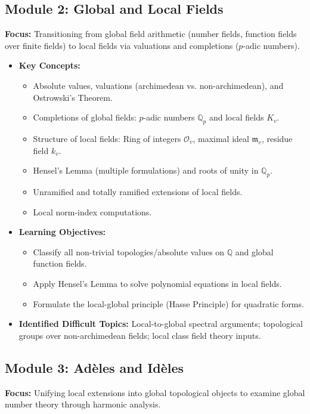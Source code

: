 \documentclass[11pt]{article}
\begin{document}
\subsection*{Module 2: Global and Local Fields}
\textbf{Focus:} Transitioning from global field arithmetic (number fields, function fields over finite fields) to local fields via valuations and completions ($p$-adic numbers).

\begin{itemize}[leftmargin=*]
    \item \textbf{Key Concepts:}
        \begin{itemize}
            \item Absolute values, valuations (archimedean vs. non-archimedean), and Ostrowski's Theorem.
            \item Completions of global fields: $p$-adic numbers $\mathbb{Q}_p$ and local fields $K_v$.
            \item Structure of local fields: Ring of integers $\mathcal{O}_v$, maximal ideal $\mathfrak{m}_v$, residue field $k_v$.
            \item Hensel's Lemma (multiple formulations) and roots of unity in $\mathbb{Q}_p$.
            \item Unramified and totally ramified extensions of local fields.
            \item Local norm-index computations.
        \end{itemize}
    \item \textbf{Learning Objectives:}
        \begin{itemize}
            \item Classify all non-trivial topologies/absolute values on $\mathbb{Q}$ and global function fields.
            \item Apply Hensel's Lemma to solve polynomial equations in local fields.
            \item Formulate the local-global principle (Hasse Principle) for quadratic forms.
        \end{itemize}
    \item \textbf{Identified Difficult Topics:} Local-to-global spectral arguments; topological groups over non-archimedean fields; local class field theory inputs.
\end{itemize}

\subsection*{Module 3: Adèles and Idèles}
\textbf{Focus:} Unifying local extensions into global topological objects to examine global number theory through harmonic analysis.
\end{document}
